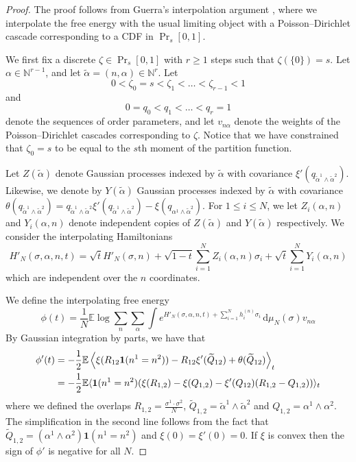 \documentclass[11pt]{amsart}
\theoremstyle{remark}
\theoremstyle{definition}
\numberwithin{equation}{section}
\numberwithin{proposition}{section}
\numberwithin{figure}{section}
\numberwithin{table}{section}
\newcommand{\N}{\mathbb{N}}
\newcommand{\E}{\mathbb{E}}
\renewcommand{\leq}{\leqslant}
\renewcommand{\geq}{\geqslant}
\renewcommand{\tilde}{\widetilde}
\renewcommand{\d}{\mathrm{d}}
\newcommand{\1}{\mathbf{1}}
\newcommand{\la}{\left\langle}
\newcommand{\ra}{\right\rangle}
\newcommand{\pnp}{{(n)}}
\begin{document}
\begin{proof} The proof follows from Guerra's interpolation argument \cite{gue03}, where we interpolate the free energy with the usual limiting object with a Poisson--Dirichlet cascade corresponding to a CDF in $\Pr_s[0,1]$. 

We first fix a discrete $\zeta \in \Pr_s[0,1]$ with $r \geq 1$ steps such that $\zeta(\{ 0\}) = s$. Let $\alpha \in \N^{r- 1}$, and let $\tilde \alpha = (n,\alpha) \in \N^{r}$. Let $$0 < \zeta_0 = s < \zeta_1 < \dots < \zeta_{r - 1} < 1$$ and $$0 = q_0 < q_1 < \dots < q_r = 1$$
denote the sequences of order parameters, and let $v_{n\alpha}$ denote the weights of the Poisson--Dirichlet cascades corresponding to $\zeta$. Notice that we have constrained that $\zeta_0 = s$ to be equal to the $s$th moment of the partition function.
 
Let $Z(\tilde \alpha)$ denote  Gaussian processes indexed by $\tilde \alpha$ with covariance $\xi'(q_{\tilde \alpha^1 \wedge \tilde \alpha^2})$. Likewise, we denote by $Y(\tilde \alpha)$ Gaussian processes indexed by $\tilde \alpha$ with covariance $\theta(q_{\tilde \alpha^1 \wedge \tilde \alpha^2}) = q_{\tilde\alpha^1 \wedge \tilde \alpha^2} \xi'(q_{\tilde \alpha^1 \wedge \tilde \alpha^2}) - \xi(q_{\alpha^1 \wedge \tilde \alpha^2})$. For $1 \leq i \leq N$, we let $Z_i(\alpha,n)$ and $Y_i(\alpha,n)$ denote independent copies of $Z(\tilde \alpha)$ and $Y(\tilde \alpha)$ respectively. We consider the interpolating Hamiltonians
\[
H'_N(\sigma,\alpha,n,t) = \sqrt{t} H'_N(\sigma,n) + \sqrt{1 - t} \sum_{i = 1}^N Z_i(\alpha,n) \sigma_i + \sqrt{t}  \sum_{i = 1}^N Y_i(\alpha,n)
\]
which are independent over the $n$ coordinates. 
 
 We define the interpolating free energy
 \[
 \phi(t) = \frac{1}{N} \E \log \sum_{n} \sum_{\alpha} \int e^{H'_N(\sigma,\alpha,n,t) + \sum_{i=1}^N h_i^\pnp \sigma_i} \, \d\mu_N(\sigma) v_{n\alpha}
 \]
By Gaussian integration by parts, we have that
\begin{align}
\phi'(t) &= -\frac{1}{2}\E\la\xi(R_{12}\1(n^1=n^2))-R_{12}\xi'(\tilde Q_{12})+\theta(\tilde Q_{12})\ra_t \notag
\\&= -\frac{1}{2} \E \langle \1(n^1 = n^2) ( \xi(R_{1,2}) - \xi(Q_{1,2}) - \xi'(Q_{12}) ( R_{1,2} - Q_{1,2} )  ) \rangle_t  \label{e.upboundphi}
\end{align}
where we defined the overlaps $R_{1,2} = \frac{\sigma^1 \cdot \sigma^2}{N}$, $\tilde Q_{1,2} = \tilde \alpha^1 \wedge  \tilde \alpha^2$ and $ Q_{1,2} =  \alpha^1 \wedge  \alpha^2$. The simplification in the second line follows from the fact that $\tilde Q_{1,2} = (\alpha^1 \wedge \alpha^2) \1(n^1=n^2)$ and $\xi(0)=\xi'(0)=0$. If $\xi$ is convex then the sign of $\phi'$ is negative for all $N$. 


\end{proof}
\end{document}
